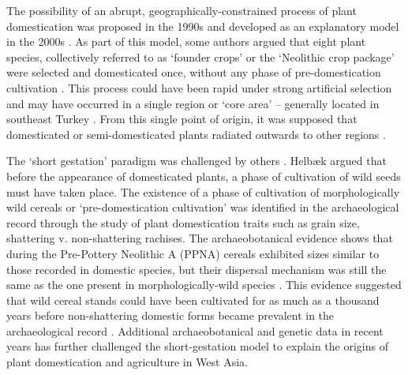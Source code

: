 \documentclass[
  authoryear,
  preprint]{elsarticle}
\begin{document}
The possibility of an abrupt, geographically-constrained process of
plant domestication was proposed in the 1990s
\citep{HillmanDavies1990, HillmanDavies1992, HeunEtAl1997, OzkanEtAl2002}
and developed as an explanatory model in the 2000s
\citep{LevYadunEtAl2000, GopherEtAl2001, AbboEtAl2005}. As part of this
model, some authors
\citep{LevYadunEtAl2000, GopherEtAl2001, AbboEtAl2010, AbboEtAl2012}
argued that eight plant species, collectively referred to as `founder
crops' or the `Neolithic crop package' \citep{ZoharyHopf1988} were
selected and domesticated once, without any phase of pre-domestication
cultivation \citep[p.~177]{AbboEtAl2011}. This process could have been
rapid under strong artificial selection
\citep{HillmanDavies1990, HillmanDavies1992} and may have occurred in a
single region or `core area' -- generally located in southeast Turkey
\citep{LadizinskyAdler1976, HeunEtAl1997, OzkanEtAl2002, OzkanEtAl2005, MoriEtAl2003, LuoEtAl2007}.
From this single point of origin, it was supposed that domesticated or
semi-domesticated plants radiated outwards to other regions
\citep{AbboEtAl2006, KilianEtAl2007, OzkanEtAl2011}.

The `short gestation' paradigm was challenged by others
\citep{Helbaek1969, Harris1989, Kislev1989, Colledge2001, WeissEtAl2004, WillcoxEtAl2008, FullerEtAl2018}.
Helbæk \citep[in][]{Kirkbride1966} argued that before the appearance of
domesticated plants, a phase of cultivation of wild seeds must have
taken place. The existence of a phase of cultivation of morphologically
wild cereals or `pre-domestication cultivation' was identified in the
archaeological record through the study of plant domestication traits
such as grain size, shattering v. non-shattering rachises. The
archaeobotanical evidence shows that during the Pre-Pottery Neolithic A
(PPNA) cereals exhibited sizes similar to those recorded in domestic
species, but their dispersal mechanism was still the same as the one
present in morphologically-wild species \citep[i.e.~shattering,
see][]{Kirkbride1966, Kislev1989, HillmanEtAl2001, Colledge2001, WillcoxEtAl2008}.
This evidence suggested that wild cereal stands could have been
cultivated for as much as a thousand years before non-shattering
domestic forms became prevalent in the archaeological record
\citep{TannoWillcox2006, TannoWillcox2012, ArranzOtaeguiEtAl2016}.
Additional archaeobotanical
\citep{Colledge2001, WillcoxEtAl2008, WillcoxEtAl2009, RiehlEtAl2013, ArranzOtaeguiEtAl2016, WeideEtAl2018, DoucheWillcox2018, WhitlamEtAl2018}
and genetic data
\citep{BadrEtAl2000, MolinaCanoEtAl2005, KilianEtAl2007, OzkanEtAl2011, IobBotigue2023}
in recent years has further challenged the short-gestation model to
explain the origins of plant domestication and agriculture in West Asia.
\end{document}

